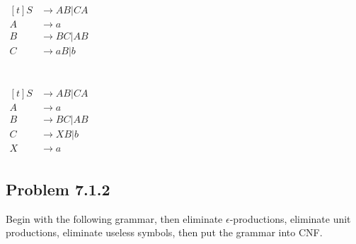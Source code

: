 \documentclass[12pt]{scrbook}
\begin{document}
$ \begin{aligned}[t]
  S &\rightarrow AB | CA \\
  A &\rightarrow a \\
  B &\rightarrow BC | AB \\
  C &\rightarrow aB | b
  \end{aligned} $
\\\\\\
$ \begin{aligned}[t]
  S &\rightarrow AB | CA \\
  A &\rightarrow a \\
  B &\rightarrow BC | AB \\
  C &\rightarrow XB | b \\
  X &\rightarrow a \\
  \end{aligned} $

\newpage \subsection*{Problem 7.1.2}Begin with the following grammar, then
eliminate $\epsilon$-productions, eliminate unit productions, eliminate
useless symbols, then put the grammar into CNF.
\end{document}
